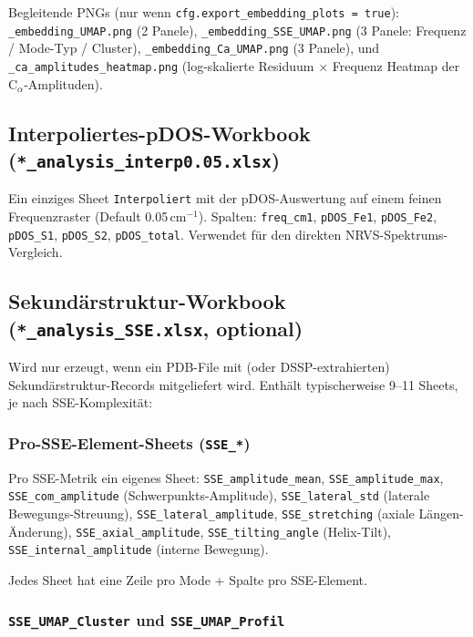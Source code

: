 \documentclass[11pt,a4paper,twoside]{article}
\theoremstyle{remark}
\begin{document}
Begleitende PNGs (nur wenn \texttt{cfg.export\_embedding\_plots = true}):
\texttt{\_embedding\_UMAP.png} (2 Panele),
\texttt{\_embedding\_SSE\_UMAP.png} (3 Panele: Frequenz / Mode-Typ /
Cluster), \texttt{\_embedding\_Ca\_UMAP.png} (3 Panele), und
\texttt{\_ca\_amplitudes\_heatmap.png} (log-skalierte
Residuum $\times$ Frequenz Heatmap der C$_\alpha$-Amplituden).

\subsection{Interpoliertes-pDOS-Workbook
            (\texttt{*\_analysis\_interp0.05.xlsx})}
\label{app:wb-interp}

Ein einziges Sheet \texttt{Interpoliert} mit der pDOS-Auswertung
auf einem feinen Frequenzraster (Default 0.05\,cm$^{-1}$). Spalten:
\texttt{freq\_cm1}, \texttt{pDOS\_Fe1}, \texttt{pDOS\_Fe2},
\texttt{pDOS\_S1}, \texttt{pDOS\_S2}, \texttt{pDOS\_total}.
Verwendet f\"ur den direkten NRVS-Spektrums-Vergleich.

\subsection{Sekund\"arstruktur-Workbook
            (\texttt{*\_analysis\_SSE.xlsx}, optional)}
\label{app:wb-sse}

Wird nur erzeugt, wenn ein PDB-File mit (oder DSSP-extrahierten)
Sekund\"arstruktur-Records mitgeliefert wird. Enth\"alt typischerweise
9--11 Sheets, je nach SSE-Komplexit\"at:

\subsubsection*{Pro-SSE-Element-Sheets (\texttt{SSE\_*})}

Pro SSE-Metrik ein eigenes Sheet:
\texttt{SSE\_amplitude\_mean},
\texttt{SSE\_amplitude\_max},
\texttt{SSE\_com\_amplitude} (Schwerpunkts-Amplitude),
\texttt{SSE\_lateral\_std} (laterale Bewegungs-Streuung),
\texttt{SSE\_lateral\_amplitude},
\texttt{SSE\_stretching} (axiale L\"angen-\"Anderung),
\texttt{SSE\_axial\_amplitude},
\texttt{SSE\_tilting\_angle} (Helix-Tilt),
\texttt{SSE\_internal\_amplitude} (interne Bewegung).

Jedes Sheet hat eine Zeile pro Mode + Spalte pro SSE-Element.

\subsubsection*{\texttt{SSE\_UMAP\_Cluster} und \texttt{SSE\_UMAP\_Profil}}
\end{document}
